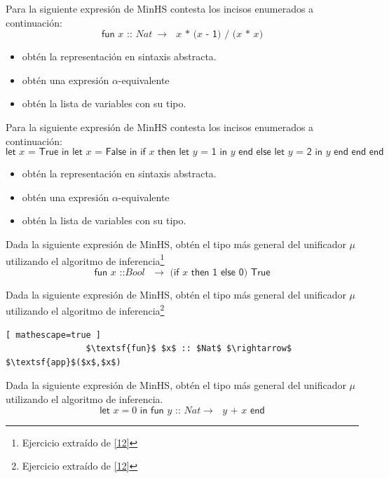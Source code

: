 	\begin{exercise}
		Para la siguiente expresión de \textsf{MinHS} contesta los incisos enumerados a continuación:
		\[
			\textsf{fun $x$ :: $Nat\ \rightarrow$ $x$ * ($x$ - 1) / ($x$ * $x$)}
		\]
		\begin{itemize}
			\item obtén la representación en sintaxis abstracta.
			\item obtén una expresión $\alpha$-equivalente
			\item obtén la lista de variables con su tipo.
		\end{itemize}
	\end{exercise}

	\begin{exercise}
		Para la siguiente expresión de \textsf{MinHS} contesta los incisos enumerados a continuación:
		\[
			\textsf{let $x$ = True in let $x$ = False in if $x$ then let $y$ = 1 in $y$  end else let $y$ = 2 in $y$ end end end}
		\]
		\begin{itemize}
			\item obtén la representación en sintaxis abstracta.
			\item obtén una expresión $\alpha$-equivalente
			\item obtén la lista de variables con su tipo.
		\end{itemize}
	\end{exercise}

    \begin{exercise} Dada la siguiente expresión de \textsf{MinHS}, obtén el tipo más general del unificador $\mu$ utilizando el algoritmo de inferencia\footnote{Ejercicio extraído de \hyperlink{12}{[12]}}
          \[
                \textsf{fun $x$ ::$Bool$ $\rightarrow$ (if $x$ then 1 else 0) True}
	\]
    \end{exercise}


    \begin{exercise} Dada la siguiente expresión de \textsf{MinHS}, obtén el tipo más general del unificador $\mu$ utilizando el algoritmo de inferencia\footnote{Ejercicio extraído de \hyperlink{12}{[12]}}
           \begin{lstlisting}[ mathescape=true ]
                $\textsf{fun}$ $x$ :: $Nat$ $\rightarrow$ $\textsf{app}$($x$,$x$)
           \end{lstlisting} 
    \end{exercise}


   \begin{exercise} Dada la siguiente expresión de \textsf{MinHS}, obtén el tipo más general del unificador $\mu$ utilizando el algoritmo de inferencia.
	\[
		\textsf{let $x = 0$ in fun $y$ :: $Nat \rightarrow$  $y$ + $x$ end}
	\]
   \end{exercise}

